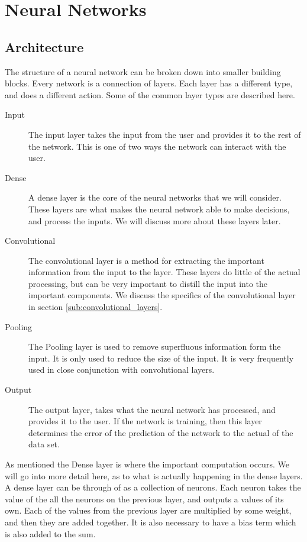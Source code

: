 \documentclass{amsart}
\begin{document}
\section{Neural Networks} \label{neural_networks}

\subsection{Architecture}\label{sub:architecture}

The structure of a neural network can be broken down into smaller building
blocks. Every network is a connection of layers. Each layer has a different
type, and does a different action. Some of the common layer types are described
here.
\begin{description}
  \item[Input] The input layer takes the input from the user and provides it to
    the rest of the network. This is one of two ways the network can interact
    with the user.
  \item[Dense] A dense layer is the core of the neural networks that we will
    consider. These layers are what makes the neural network able to make
    decisions, and process the inputs. We will discuss more about these layers
    later.
  \item[Convolutional] The convolutional layer is a method for extracting the
    important information from the input to the layer. These layers do little
    of the actual processing, but can be very important to distill the input
    into the important components. We discuss the specifics of the
    convolutional layer in section \ref{sub:convolutional_layers}.
  \item[Pooling] The Pooling layer is used to remove superfluous information
    form the input. It is only used to reduce the size of the input. It is very
    frequently used in close conjunction with convolutional layers.
  \item[Output] The output layer, takes what the neural network has processed,
    and provides it to the user. If the network is training, then this layer
    determines the error of the prediction of the network to the actual of the
    data set.
\end{description}

As mentioned the Dense layer is where the important computation occurs. We will
go into more detail here, as to what is actually happening in the dense layers.
A dense layer can be through of as a collection of neurons. Each neuron takes
the value of the all the neurons on the previous layer, and outputs a values of
its own. Each of the values from the previous layer are multiplied by some
weight, and then they are added together. It is also necessary to have a bias
term which is also added to the sum.
\end{document}
